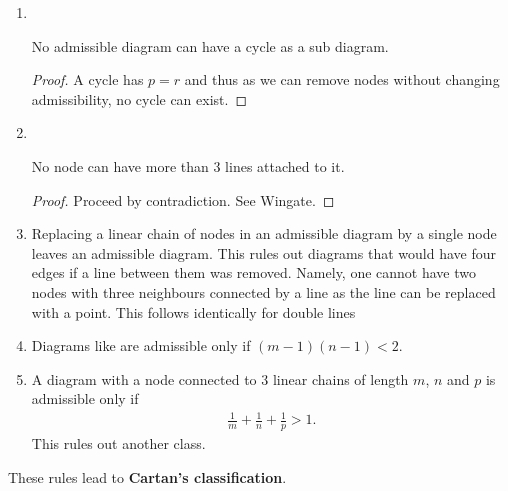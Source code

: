 \begin{enumerate}[label=\roman*)]
\begin{proof}
                \end{proof}
             \item ~
                 \begin{corollary}
                     No admissible diagram can have a cycle as a sub diagram.
                 \end{corollary}
                 \begin{proof}
                     A cycle has $p = r$ and thus as we can remove nodes without changing admissibility, no cycle can exist.
                 \end{proof}
             \item ~
                 \begin{claim}
                     No node can have more than $3$ lines attached to it.
                 \end{claim}
                 \begin{proof}
                     Proceed by contradiction. See Wingate.
                 \end{proof}
             \item Replacing a linear chain of nodes in an admissible diagram by a single node leaves an admissible diagram.
                 This rules out diagrams that would have four edges if a line between them was removed. Namely, one cannot have two nodes with three neighbours connected by a line as the line can be replaced with a point. This follows identically for double lines
             \item Diagrams like
                 are admissible only if $\left( m - 1 \right) \left( n - 1 \right)  < 2$.
             \item A diagram with a node connected to $3$ linear chains of length $m$, $n$ and $p$ is admissible only if
                 \begin{align}
                     \frac{1}{m} + \frac{1}{n} + \frac{1}{p} > 1
                 .\end{align}
                 This rules out another class.
 \end{enumerate}


These rules lead to \textbf{Cartan's classification}.

